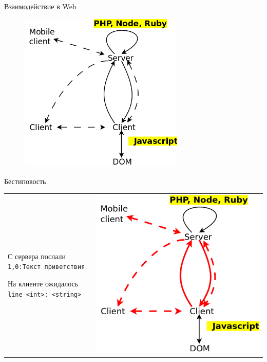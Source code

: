 \documentclass{beamer}
\theoremstyle{definition}
\begin{document}
\begin{frame}[fragile]{Взаимодействие в Web}
\begin{figure}
\centering
\includegraphics[width=0.7\textwidth]{web1.png}
\end{figure}
\end{frame}


\begin{frame}[fragile]{Бестиповость}

\begin{tabular}{l r}
  \begin{minipage}{5cm}
  \begin{block}{С сервера послали}
  \verb=1,0:Текст приветствия=
  \end{block}
  \begin{block}{На клиенте ожидалось}
  \verb=line <int>: <string>=
  \end{block}
  \end{minipage} & 
    \includegraphics[width=.5\textwidth]{web2.png}
\end{tabular}   
\end{frame}
\end{document}
